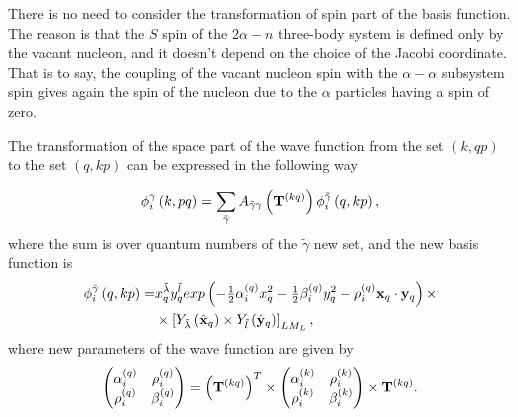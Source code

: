\documentclass[
12pt, %
oneside, %
english, %
onehalfspacing, %
headsepline, %
]{MastersDoctoralThesis} %
\begin{document}
There is no need to consider the transformation of spin part of the basis function. The reason is that the $S$ spin of the $2\alpha-n$ three-body system is defined only by the vacant nucleon, and it doesn't depend on the choice of the Jacobi coordinate. That is to say, the coupling of the vacant nucleon spin with the $\alpha-\alpha$ subsystem spin gives again the spin of the nucleon due to the $\alpha$ particles having a spin of zero.  

The transformation of the space part of the wave function from the set $ \left(k, qp \right) $ to the set $ \left(q, kp \right) $ can be expressed in the following way

  \begin{equation}
 \label{transformbasisfunction}
 \phi_{i}^{\gamma}\left(k, pq \right) = \sum_{\tilde{\gamma}} A_{\tilde{\gamma}\gamma}\left( {\bf T}^{(kq)} \right)
  \phi_{i}^{\tilde{\gamma} } \left(q, kp \right) ,
 \end{equation}
where the sum is over quantum numbers of the $ \tilde {\gamma} $ new set, and the new basis function is
\begin{align}
\phi_{i}^{\tilde{\gamma} } \left(q, kp \right)  =  &
 x_{q}^{\tilde{\lambda}} y_{q}^{\tilde{l}} exp\left(- \tfrac{1}{2} \alpha^{(q)}_{i} x_{q}^{2} - \tfrac{1}{2} \beta^{(q)}_{i}  y_{q}^{2} - \rho^{(q)}_i {\bf x}_{q} \cdot {\bf y}_{q}  \right) 
\times  \nonumber \\ 
&\times  \left[ Y_{\tilde{\lambda}} \left(  \hat{ \bf x}_q \right) \times Y_{\tilde{l}} \left( \hat{\bf y}_q \right) \right]_{LM_L},
\label{newBasis}
\end{align}
where new parameters of the wave function are given by
\begin{align}
\begin{pmatrix}
\alpha_i^{(q)} & \rho_i^{(q)} \\ 
\rho_i^{(q)} & \beta_i^{(q)}
\end{pmatrix}  = \left( {\bf T}^{(kq)} \right)^{T} \times 
\begin{pmatrix}
\alpha_i^{(k)} & \rho_i^{(k)} \\ 
\rho_i^{(k)} & \beta_i^{(k)}
\end{pmatrix} \times  {\bf T}^{(kq)}.
\end{align}
\end{document}
